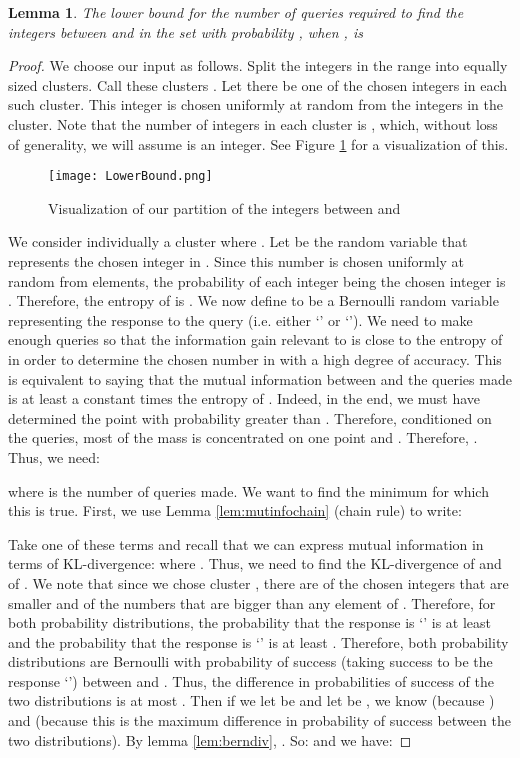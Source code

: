 \documentclass[12pt]{article}
\newtheorem{lemma}[theorem]{Lemma}
\begin{document}
\begin{lemma} 
The lower bound for the number of queries required to find the  integers  between  and  in the set  with probability , when , is 
\end{lemma}
\begin{proof}
We choose our input as follows. Split the integers in the range  into  equally sized clusters. Call these clusters . Let there be one of the  chosen integers in each such cluster. This integer is chosen uniformly at random from the integers in the cluster. Note that the number of integers in each cluster is , which, without loss of generality, we will assume is an integer. See Figure \ref{fig:lowerbound} for a visualization of this.

\begin{figure}[ht]
	\centering
		\texttt{[image: LowerBound.png]}
	\caption{Visualization of our partition of the integers between  and }
	\label{fig:lowerbound}
\end{figure} 

We consider individually a cluster  where . Let  be the random variable that represents the chosen integer in . Since this number is chosen uniformly at random from  elements, the probability of each integer being the chosen integer is . Therefore, the entropy of  is . We now define  to be a Bernoulli random variable representing the response to the  query (i.e. either `' or `'). We need to make enough queries so that the information gain relevant to  is close to the entropy of  in order to determine the chosen number in  with a high degree of accuracy. This is equivalent to saying that the mutual information between  and the queries made  is at least a constant times the entropy of . Indeed, in the end, we must have determined the point with probability greater than . Therefore, conditioned on the queries, most of the mass is concentrated on one point and . Therefore, . Thus, we need: 

where  is the number of queries made. We want to find the minimum  for which this is true. First, we use Lemma \ref{lem:mutinfochain} (chain rule) to write:


Take one of these terms and recall that we can express mutual information in terms of KL-divergence:
 where . Thus, we need to find the KL-divergence of  and of . We note that since we chose cluster , there are  of the  chosen integers that are smaller and  of the  numbers that are bigger than any element of . Therefore, for both probability distributions, the probability that the response is `' is at least  and the probability that the response is `' is at least . Therefore, both probability distributions are Bernoulli with probability of success (taking success to be the response `') between  and . Thus, the difference in probabilities of success of the two distributions is at most . Then if we let  be  and let  be , we know  (because ) and  (because this is the maximum difference in probability of success between the two distributions). By lemma \ref{lem:berndiv}, . So:  and we have: 


\end{proof}
\end{document}
